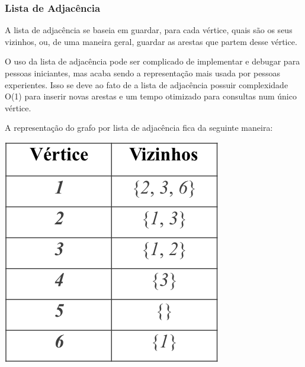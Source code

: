 \documentclass[a4paper,12pt]{article}
\begin{document}
\subsubsection{Lista de Adjacência}

\indent\indent A lista de adjacência se baseia em guardar, para cada vértice, quais são os seus vizinhos, ou, de uma maneira geral, guardar as arestas que partem desse vértice.

\indent O uso da lista de adjacência pode ser complicado de implementar e debugar para pessoas iniciantes, mas acaba sendo a representação mais usada por pessoas experientes. Isso se deve ao fato de a lista de adjacência possuir complexidade O(1) para inserir novas arestas e um tempo otimizado para consultas num único vértice.

\indent A representação do grafo por lista de adjacência fica da seguinte maneira:

\begin{center}
  \includegraphics[width=\linewidth/2]{figures/grafos/representacao_lista_adj.png}
\end{center}
\end{document}
